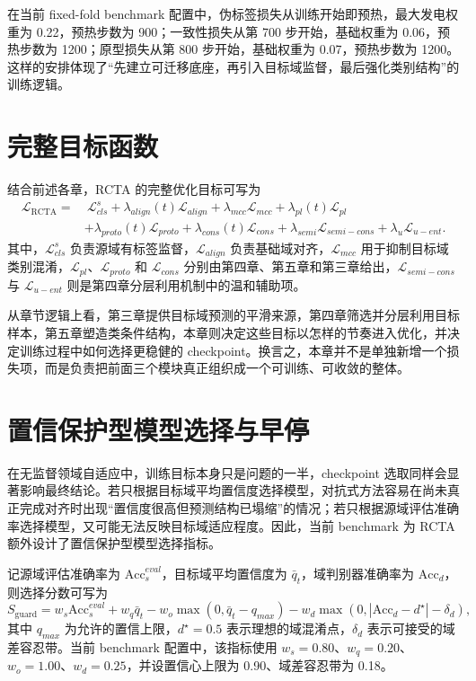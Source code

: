 在当前 fixed-fold benchmark 配置中，伪标签损失从训练开始即预热，最大发电权重为 0.22，预热步数为 900；一致性损失从第 700 步开始，基础权重为 0.06，预热步数为 1200；原型损失从第 800 步开始，基础权重为 0.07，预热步数为 1200。这样的安排体现了“先建立可迁移底座，再引入目标域监督，最后强化类别结构”的训练逻辑。

\section{完整目标函数}
结合前述各章，RCTA 的完整优化目标可写为
\begin{align}
\mathcal{L}_{\mathrm{RCTA}}=
&\ \mathcal{L}_{cls}^{s}
+\lambda_{align}(t)\mathcal{L}_{align}
+\lambda_{mcc}\mathcal{L}_{mcc}
+\lambda_{pl}(t)\mathcal{L}_{pl}\nonumber\\
&+\lambda_{proto}(t)\mathcal{L}_{proto}
+\lambda_{cons}(t)\mathcal{L}_{cons}
+\lambda_{semi}\mathcal{L}_{semi-cons}
+\lambda_{u}\mathcal{L}_{u-ent}.
\end{align}
其中，$\mathcal{L}_{cls}^{s}$ 负责源域有标签监督，$\mathcal{L}_{align}$ 负责基础域对齐，$\mathcal{L}_{mcc}$ 用于抑制目标域类别混淆，$\mathcal{L}_{pl}$、$\mathcal{L}_{proto}$ 和 $\mathcal{L}_{cons}$ 分别由第四章、第五章和第三章给出，$\mathcal{L}_{semi-cons}$ 与 $\mathcal{L}_{u-ent}$ 则是第四章分层利用机制中的温和辅助项。

从章节逻辑上看，第三章提供目标域预测的平滑来源，第四章筛选并分层利用目标样本，第五章塑造类条件结构，本章则决定这些目标以怎样的节奏进入优化，并决定训练过程中如何选择更稳健的 checkpoint。换言之，本章并不是单独新增一个损失项，而是负责把前面三个模块真正组织成一个可训练、可收敛的整体。

\section{置信保护型模型选择与早停}
在无监督领域自适应中，训练目标本身只是问题的一半，checkpoint 选取同样会显著影响最终结论。若只根据目标域平均置信度选择模型，对抗式方法容易在尚未真正完成对齐时出现“置信度很高但预测结构已塌缩”的情况；若只根据源域评估准确率选择模型，又可能无法反映目标域适应程度。因此，当前 benchmark 为 RCTA 额外设计了置信保护型模型选择指标。

记源域评估准确率为 $\mathrm{Acc}_{s}^{eval}$，目标域平均置信度为 $\bar{q}_{t}$，域判别器准确率为 $\mathrm{Acc}_{d}$，则选择分数可写为
\begin{equation}
S_{\mathrm{guard}}=
w_s\mathrm{Acc}_{s}^{eval}
+w_q\bar{q}_t
-w_o\max(0,\bar{q}_t-q_{max})
-w_d\max(0,|\mathrm{Acc}_{d}-d^\star|-\delta_d),
\end{equation}
其中 $q_{max}$ 为允许的置信上限，$d^\star=0.5$ 表示理想的域混淆点，$\delta_d$ 表示可接受的域差容忍带。当前 benchmark 配置中，该指标使用 $w_s=0.80$、$w_q=0.20$、$w_o=1.00$、$w_d=0.25$，并设置信心上限为 0.90、域差容忍带为 0.18。

